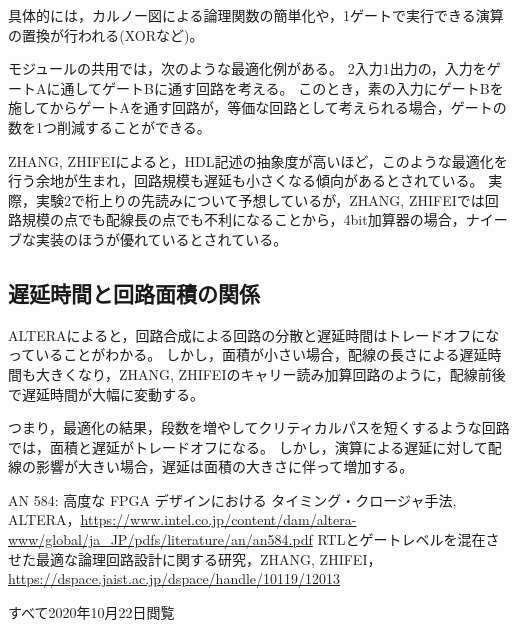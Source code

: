 \documentclass[a4paper,15pt]{jsarticle}
\begin{document}
具体的には，カルノー図による論理関数の簡単化や，1ゲートで実行できる演算の置換が行われる(XORなど)。

モジュールの共用では，次のような最適化例がある。
2入力1出力の，入力をゲートAに通してゲートBに通す回路を考える。
このとき，素の入力にゲートBを施してからゲートAを通す回路が，等価な回路として考えられる場合，ゲートの数を1つ削減することができる。

ZHANG, ZHIFEI\cite{RTL}によると，HDL記述の抽象度が高いほど，このような最適化を行う余地が生まれ，回路規模も遅延も小さくなる傾向があるとされている。
実際，実験2で桁上りの先読みについて予想しているが，ZHANG, ZHIFEI\cite{RTL}では回路規模の点でも配線長の点でも不利になることから，4bit加算器の場合，ナイーブな実装のほうが優れているとされている。

\subsection{遅延時間と回路面積の関係}
ALTERA\cite{ALTERA}によると，回路合成による回路の分散と遅延時間はトレードオフになっていることがわかる。
しかし，面積が小さい場合，配線の長さによる遅延時間も大きくなり，ZHANG, ZHIFEI\cite{RTL}のキャリー読み加算回路のように，配線前後で遅延時間が大幅に変動する。

つまり，最適化の結果，段数を増やしてクリティカルパスを短くするような回路では，面積と遅延がトレードオフになる。
しかし，演算による遅延に対して配線の影響が大きい場合，遅延は面積の大きさに伴って増加する。

\begin{thebibliography}{99}
  AN 584: 高度な FPGA デザインにおける  タイミング・クロージャ手法, ALTERA，\url{https://www.intel.co.jp/content/dam/altera-www/global/ja_JP/pdfs/literature/an/an584.pdf}
   RTLとゲートレベルを混在させた最適な論理回路設計に関する研究，ZHANG, ZHIFEI，\url{https://dspace.jaist.ac.jp/dspace/handle/10119/12013}
\end{thebibliography}
すべて2020年10月22日閲覧
\end{document}
